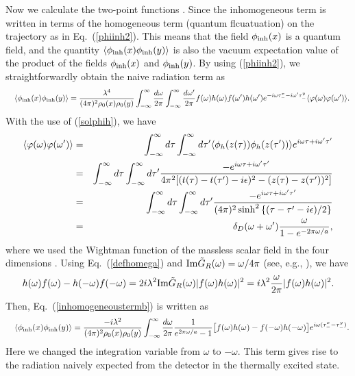 \documentclass[aps,prd,preprintnumbers,nofootinbib,showpacs]{revtex4}%
\begin{document}
\begin{widetext}
Now we calculate the two-point functions \cite{IYZ,IYZ2013,IOTYZ}.
Since the inhomogeneous term is written in terms of the homogeneous term
 (quantum flcuatuation) on the trajectory as in Eq.~(\ref{phiinh2}). 
This means that the field $\phi_{\rm inh}(x)$ is a quantum field, and the quantity 
$\langle\phi_{\rm inh}(x)\phi_{\rm inh}(y)\rangle$ is also the vacuum expectation 
value of the product of the fields $\phi_{\rm inh}(x)$ and $\phi_{\rm inh}(y)$.
By using (\ref{phiinh2}), we straightforwardly obtain the naive radiation term as
\begin{eqnarray}
&&\langle\phi_{\rm inh}(x)\phi_{\rm inh}(y)\rangle
  ={\lambda^4\over (4\pi)^2\rho_0(x)\rho_0(y)}
  \int _{-\infty}^{\infty}{d\omega\over2\pi}  \int _{-\infty}^{\infty}{d\omega'\over2\pi}
f(\omega)h(\omega)f(\omega')h(\omega')e^{-i\omega\tau_-^x-i\omega'\tau_-^y} \langle
\varphi(\omega)\varphi(\omega')\rangle.
\label{inhomogeneoustermb}
\end{eqnarray}
With the use of (\ref{solphih}), we have
\begin{eqnarray}
\langle\varphi(\omega)\varphi(\omega')\rangle
&=&\int _{-\infty}^{\infty} d\tau \int _{-\infty}^{\infty} d\tau'\langle \phi_h(z(\tau))\phi_h(z(\tau'))\rangle
e^{i\omega\tau+i\omega'\tau'}
\nonumber\\
&=&\int _{-\infty}^{\infty} d\tau \int _{-\infty}^{\infty} d\tau'{-e^{i\omega\tau+i\omega'\tau'}\over 4\pi^2
[(t(\tau)-t(\tau')-i\epsilon)^2-(z(\tau)-z(\tau'))^2]}
\nonumber\\
&=&\int _{-\infty}^{\infty} d\tau \int _{-\infty}^{\infty} d\tau'{-e^{i\omega\tau+i\omega'\tau'}\over (4\pi)^2
\sinh^2\left\{(\tau-\tau'-i\epsilon)/2\right\}}
\nonumber\\
&=&\delta_D(\omega+\omega'){\omega\over 1-e^{-2\pi\omega/a}}, 
\end{eqnarray}
where we used the Wightman function of the massless scalar field in the four dimensions
\cite{BD}. Using Eq.~(\ref{defhomega}) and ${\rm Im}\tilde G_R(\omega)=\omega/4\pi$ (see, e.g., 
\cite{IYZ2013}), we have
\begin{eqnarray}
h(\omega)f(\omega)-h(-\omega)f(-\omega)
=2i\lambda^2 {\rm Im}\tilde G_R(\omega)|f(\omega)h(\omega)|^2 
=i\lambda^2{\omega\over 2\pi}|f(\omega)h(\omega)|^2.
\end{eqnarray}
Then, Eq.~(\ref{inhomogeneoustermb}) is written as
\begin{eqnarray}
&&\langle\phi_{\rm inh}(x)\phi_{\rm inh}(y)\rangle
  ={-i\lambda^2\over (4\pi)^2\rho_0(x)\rho_0(y)}
  \int _{-\infty}^{\infty}{d\omega\over2\pi}{1\over e^{2\pi\omega/a}-1}
\bigr[f(\omega)h(\omega)-f(-\omega)h(-\omega)\bigl]e^{i\omega(\tau_-^x-\tau_-^y)} .
\label{inhomogeneousterm}
\end{eqnarray}
Here we changed the integration variable from $\omega$ to $-\omega$.
This term gives rise to the radiation naively expected from the detector
in the thermally excited state.


\end{widetext}
\end{document}
